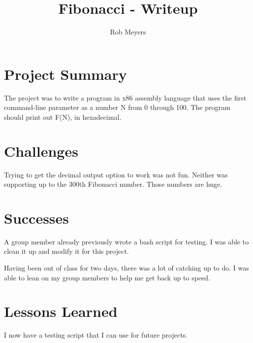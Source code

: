 \documentclass{article}
\title{Fibonacci - Writeup}
\author{Rob Meyers}
\date{}
\begin{document}
\maketitle

\section*{Project Summary}
The project was to write a program in x86 assembly language that uses the
first command-line parameter as a number N from 0 through 100. The
program should print out F(N), in hexadecimal.



\section*{Challenges}

\noindent
Trying to get the decimal output option to work was not fun. Neither was
supporting up to the 300th Fibonacci number. Those numbers are huge.



\section*{Successes}

\noindent
A group member already previously wrote a bash script for testing. I was able
to clean it up and modify it for this project.

\bigbreak
\noindent
Having been out of class for two days, there was a lot of catching up to
do. I was able to lean on my group members to help me get back up to speed.



\section*{Lessons Learned}

\noindent
I now have a testing script that I can use for future projects.
\end{document}
